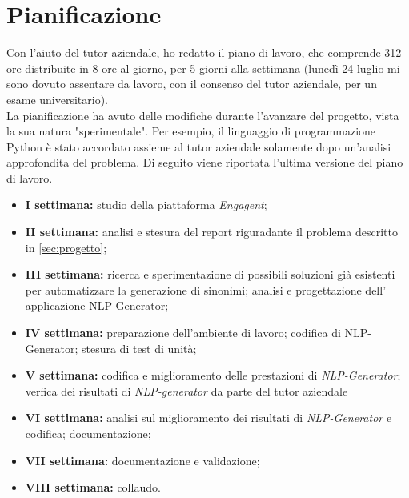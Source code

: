 \section{Pianificazione}
Con l'aiuto del tutor aziendale, ho redatto il piano di lavoro, che comprende 312 ore distribuite in 8 ore al giorno, per 5 giorni alla settimana (lunedì 24 luglio mi sono dovuto assentare da lavoro, con il consenso del tutor aziendale, per un esame universitario).\\
La pianificazione ha avuto delle modifiche durante l'avanzare del progetto, vista la sua natura "sperimentale". Per esempio, il linguaggio di programmazione Python è stato accordato assieme al tutor aziendale solamente dopo un'analisi approfondita del problema.
Di seguito viene riportata l'ultima versione del piano di lavoro.
\begin{itemize}
    \item \textbf{I settimana:} studio della piattaforma \emph{Engagent};
    \item \textbf{II settimana:} analisi e stesura del report riguradante il problema descritto in \ref{sec:progetto};
    \item \textbf{III settimana:} ricerca e sperimentazione di possibili soluzioni già esistenti per automatizzare la generazione di sinonimi; analisi e progettazione dell' applicazione NLP-Generator;
    \item \textbf{IV settimana:} preparazione dell'ambiente di lavoro; codifica di NLP-Generator; stesura di test di unità;
    \item \textbf{V settimana:} codifica e miglioramento delle prestazioni di \emph{NLP-Generator}; verfica dei risultati di \emph{NLP-generator} da parte del tutor aziendale
    \item \textbf{VI settimana:} analisi sul miglioramento dei risultati di \emph{NLP-Generator} e codifica; documentazione;
    \item \textbf{VII settimana:} documentazione e validazione;
    \item \textbf{VIII settimana:} collaudo.
\end{itemize}

